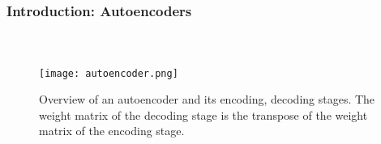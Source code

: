 
\begin{frame}[t]
	\frametitle{Introduction: Autoencoders}
	\framesubtitle{~~}  %

\begin{figure}[h]
	\centering
	\texttt{[image: autoencoder.png]}
	\caption{Overview of an autoencoder and its encoding, decoding stages. The weight matrix of the decoding stage is the transpose of the weight matrix of the encoding stage.}
	\label{fig:autoencoder}
\end{figure}


\end{frame}

